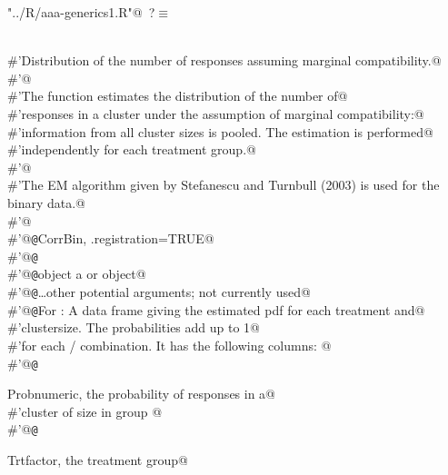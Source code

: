 \documentclass[reqno]{amsart}
\renewcommand{\NWtarget}[2]{\hypertarget{#1}{#2}}
\begin{document}
\begin{flushleft} \small
\begin{minipage}{\linewidth}\label{scrap4}\raggedright\small
\NWtarget{nuweb?}{} \verb@"../R/aaa-generics1.R"@\nobreak\ {\footnotesize {?}}$\equiv$
\vspace{-1ex}
\begin{list}{}{} \item
\mbox{}\verb@@\\
\mbox{}\verb@#'Distribution of the number of responses assuming marginal compatibility.@\\
\mbox{}\verb@#'@\\
\mbox{}\verb@#'The  function estimates the distribution of the number of@\\
\mbox{}\verb@#'responses in a cluster under the assumption of marginal compatibility:@\\
\mbox{}\verb@#'information from all cluster sizes is pooled. The estimation is performed@\\
\mbox{}\verb@#'independently for each treatment group.@\\
\mbox{}\verb@#'@\\
\mbox{}\verb@#'The EM algorithm given by Stefanescu and Turnbull (2003) is used for the binary data.@\\
\mbox{}\verb@#'@\\
\mbox{}\verb@#'@{\tt @}\verb@useDynLib CorrBin, .registration=TRUE@\\
\mbox{}\verb@#'@{\tt @}\verb@export@\\
\mbox{}\verb@#'@{\tt @}\verb@param object a  or  object@\\
\mbox{}\verb@#'@{\tt @}\verb@param \dots other potential arguments; not currently used@\\
\mbox{}\verb@#'@{\tt @}\verb@return For : A data frame giving the estimated pdf for each treatment and@\\
\mbox{}\verb@#'clustersize.  The probabilities add up to 1@\\
\mbox{}\verb@#'for each / combination. It has the following columns: @\\
\mbox{}\verb@#'@{\tt @}\verb@return \item{Prob}{numeric, the probability of  responses in a@\\
\mbox{}\verb@#'cluster of size  in group }@\\
\mbox{}\verb@#'@{\tt @}\verb@return \item{Trt}{factor, the treatment group}@\\

\end{list}
\end{minipage}
\end{flushleft}
\end{document}
